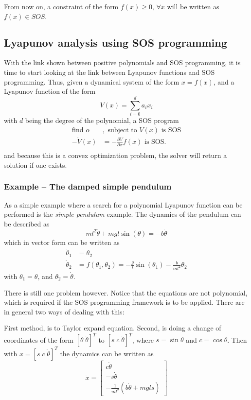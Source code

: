 From now on, a constraint of the form \(f(x) \geq 0,\, \forall x\) will be
written as \(f(x) \in SOS\).

\subsection{Lyapunov analysis using SOS programming}

With the link shown between positive polynomials and \ac{SOS} programming, it is
time to start looking at the link between Lyapunov functions and SOS
programming. Thus, given a dynamical system of the form \(\dot{x} = f(x)\), and
a Lyapunov function of the form
\[
  V(x) = \sum_{i=0}^{d} a_{i}x_{i}
\]
with \(d\) being the degree of the polynomial, a \ac{SOS} program
\begin{align*}
  \text{find \(\alpha\)}&, \text{ subject to } V(x) \text{ is SOS}\\
  -\dot{V}(x) &= -\frac{\partial V}{\partial x}f(x) \text{ is SOS}.\\
\end{align*}
\cite{tedrakeUnderactuatedRoboticsAlgorithms2019} and because this is a convex
optimization problem, the solver will return a solution if one exists.

\subsubsection{Example -- The damped simple pendulum}

As a simple example where a search for a polynomial Lyapunov function can be
performed is the \textit{simple pendulum} example. The dynamics of the pendulum
can be described as
\[
  ml^2\ddot{\theta} + mgl \sin(\theta) = -b\dot{\theta}
\]
which in vector form can be written as
\begin{align*}
  \dot{\theta}_1 &= \theta_2 \\
  \dot{\theta}_2 &= f(\theta_1,\theta_2) = -\frac{g}{l}\sin(\theta_1) -\frac{b}{ml^2}\theta_2
\end{align*}
with \(\theta_1 = \theta\), and \(\theta_2 = \dot{\theta}\).

There is still one problem however. Notice that the equations are not
polynomial, which is required if the \ac{SOS} programming framework is to be
applied. There are in general two ways of dealing with this:

First method, is to Taylor expand equation. Second, is doing a change of
coordinates of the form \(\left[ \theta \; \dot{\theta} \right]^{T} \) to
\(\left[ s \;c \; \dot{\theta} \right]^{T}\), where \(s = \sin{\theta}\) and \(c
= \cos{\theta}\). Then with \(x = {\left[ s \; c \; \dot{\theta} \right]}^{T}\)
the dynamics can be written as
\[
  \dot{x} =
  \begin{bmatrix}
    c\dot{\theta} \\
    -s\dot{\theta} \\
    - \frac{1}{ml^2} \left( b\dot{\theta} + mgl s \right)
  \end{bmatrix}
\]

